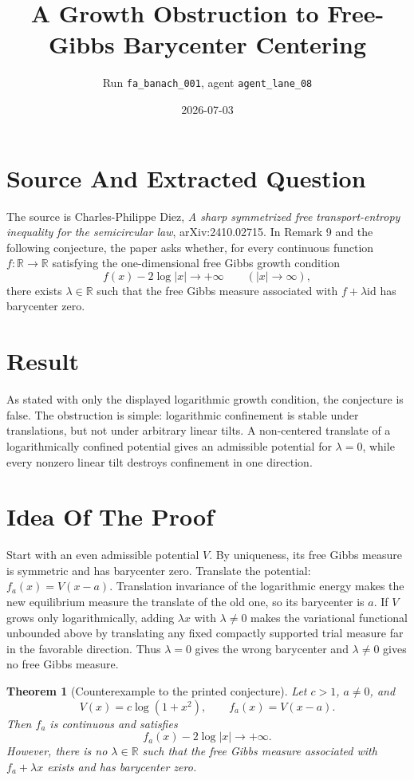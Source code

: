 \documentclass[11pt]{article}
\title{A Growth Obstruction to Free-Gibbs Barycenter Centering}
\author{Run \texttt{fa\_banach\_001}, agent \texttt{agent\_lane\_08}}
\date{2026-07-03}
\newtheorem{theorem}{Theorem}
\newcommand{\R}{\mathbb{R}}
\newcommand{\id}{\mathrm{id}}
\begin{document}
\maketitle

\section*{Source And Extracted Question}

The source is Charles-Philippe Diez, \emph{A sharp symmetrized free
transport-entropy inequality for the semicircular law}, arXiv:2410.02715.
In Remark 9 and the following conjecture, the paper asks whether, for every
continuous function \(f:\R\to\R\) satisfying the one-dimensional free Gibbs
growth condition
\[
        f(x)-2\log |x|\longrightarrow +\infty
        \qquad (|x|\to\infty),
\]
there exists \(\lambda\in\R\) such that the free Gibbs measure associated with
\(f+\lambda \id\) has barycenter zero.

\section*{Result}

As stated with only the displayed logarithmic growth condition, the conjecture
is false. The obstruction is simple: logarithmic confinement is stable under
translations, but not under arbitrary linear tilts. A non-centered translate of
a logarithmically confined potential gives an admissible potential for
\(\lambda=0\), while every nonzero linear tilt destroys confinement in one
direction.

\section*{Idea Of The Proof}

Start with an even admissible potential \(V\). By uniqueness, its free Gibbs
measure is symmetric and has barycenter zero. Translate the potential:
\(f_a(x)=V(x-a)\). Translation invariance of the logarithmic energy makes the
new equilibrium measure the translate of the old one, so its barycenter is
\(a\). If \(V\) grows only logarithmically, adding \(\lambda x\) with
\(\lambda\ne0\) makes the variational functional unbounded above by translating
any fixed compactly supported trial measure far in the favorable direction.
Thus \(\lambda=0\) gives the wrong barycenter and \(\lambda\ne0\) gives no free
Gibbs measure.

\begin{theorem}[Counterexample to the printed conjecture]
Let \(c>1\), \(a\ne0\), and
\[
        V(x)=c\log(1+x^2),\qquad f_a(x)=V(x-a).
\]
Then \(f_a\) is continuous and satisfies
\[
        f_a(x)-2\log |x|\to+\infty .
\]
However, there is no \(\lambda\in\R\) such that the free Gibbs measure
associated with \(f_a+\lambda x\) exists and has barycenter zero.
\end{theorem}
\end{document}
